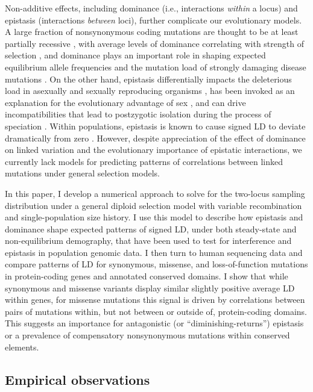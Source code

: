 \documentclass[]{article}
\begin{document}
Non-additive effects, including dominance (i.e., interactions \emph{within} a
locus) and epistasis (interactions \emph{between} loci), further complicate our
evolutionary models. A large fraction of nonsynonymous coding mutations are
thought to be at least partially recessive \citep{Agrawal2011-wb,
Huber2018-cp}, with average levels of dominance correlating with strength of
selection \citep{Kacser1981-nc}, and dominance plays an important role in
shaping expected equilibrium allele frequencies and the mutation load of
strongly damaging disease mutations \citep{Clark1998-kq}. On the other hand,
epistasis differentially impacts the deleterious load in asexually and sexually
reproducing organisms \citep{Kimura1966-gc,Kondrashov1995-va}, has been invoked
as an explanation for the evolutionary advantage of sex
\citep{Kondrashov1982-sf,Charlesworth1990-kw,Barton1998-lu}, and can drive
incompatibilities that lead to postzygotic isolation during the process of
speciation \citep{Turelli2000-kz}. Within populations, epistasis is known to
cause signed LD to deviate dramatically from zero \citep{Charlesworth1990-kw,
Kondrashov1995-va}. However, despite appreciation of the effect of dominance on
linked variation \citep{Turelli2000-kz, Zhao2016-bb} and the evolutionary
importance of epistatic interactions, we currently lack models for predicting
patterns of correlations between linked mutations under general selection
models.

In this paper, I develop a numerical approach to solve for the two-locus
sampling distribution under a general diploid selection model with variable
recombination and single-population size history. I use this model to describe
how epistasis and dominance shape expected patterns of signed LD, under both
steady-state and non-equilibrium demography, that have been used to test for
interference and epistasis in population genomic data. I then turn to human
sequencing data and compare patterns of LD for synonymous, missense, and
loss-of-function mutations in protein-coding genes and annotated conserved
domains. I show that while synonymous and missense variants display similar
slightly positive average LD within genes, for missense mutations this signal
is driven by correlations between pairs of mutations within, but not between or
outside of, protein-coding domains. This suggests an importance for
antagonistic (or ``diminishing-returns'') epistasis or a prevalence of
compensatory nonsynonymous mutations within conserved elements.

\subsection{Empirical observations}\label{sec:empirical-observations}
\end{document}
